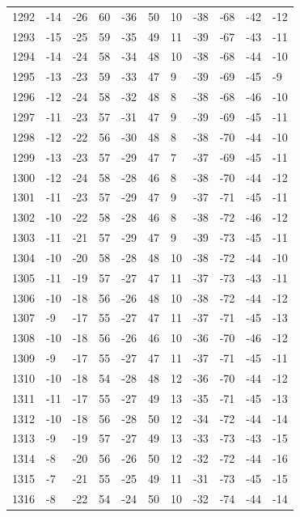 \begin{table}[H]
\begin{tabular}{lllllllllll}
1292 & -14 & -26 & 60 & -36 & 50 & 10 & -38 & -68 & -42 & -12 \\
1293 & -15 & -25 & 59 & -35 & 49 & 11 & -39 & -67 & -43 & -11 \\
1294 & -14 & -24 & 58 & -34 & 48 & 10 & -38 & -68 & -44 & -10 \\
1295 & -13 & -23 & 59 & -33 & 47 & 9 & -39 & -69 & -45 & -9 \\
1296 & -12 & -24 & 58 & -32 & 48 & 8 & -38 & -68 & -46 & -10 \\
1297 & -11 & -23 & 57 & -31 & 47 & 9 & -39 & -69 & -45 & -11 \\
1298 & -12 & -22 & 56 & -30 & 48 & 8 & -38 & -70 & -44 & -10 \\
1299 & -13 & -23 & 57 & -29 & 47 & 7 & -37 & -69 & -45 & -11 \\
1300 & -12 & -24 & 58 & -28 & 46 & 8 & -38 & -70 & -44 & -12 \\
1301 & -11 & -23 & 57 & -29 & 47 & 9 & -37 & -71 & -45 & -11 \\
1302 & -10 & -22 & 58 & -28 & 46 & 8 & -38 & -72 & -46 & -12 \\
1303 & -11 & -21 & 57 & -29 & 47 & 9 & -39 & -73 & -45 & -11 \\
1304 & -10 & -20 & 58 & -28 & 48 & 10 & -38 & -72 & -44 & -10 \\
1305 & -11 & -19 & 57 & -27 & 47 & 11 & -37 & -73 & -43 & -11 \\
1306 & -10 & -18 & 56 & -26 & 48 & 10 & -38 & -72 & -44 & -12 \\
1307 & -9 & -17 & 55 & -27 & 47 & 11 & -37 & -71 & -45 & -13 \\
1308 & -10 & -18 & 56 & -26 & 46 & 10 & -36 & -70 & -46 & -12 \\
1309 & -9 & -17 & 55 & -27 & 47 & 11 & -37 & -71 & -45 & -11 \\
1310 & -10 & -18 & 54 & -28 & 48 & 12 & -36 & -70 & -44 & -12 \\
1311 & -11 & -17 & 55 & -27 & 49 & 13 & -35 & -71 & -45 & -13 \\
1312 & -10 & -18 & 56 & -28 & 50 & 12 & -34 & -72 & -44 & -14 \\
1313 & -9 & -19 & 57 & -27 & 49 & 13 & -33 & -73 & -43 & -15 \\
1314 & -8 & -20 & 56 & -26 & 50 & 12 & -32 & -72 & -44 & -16 \\
1315 & -7 & -21 & 55 & -25 & 49 & 11 & -31 & -73 & -45 & -15 \\
1316 & -8 & -22 & 54 & -24 & 50 & 10 & -32 & -74 & -44 & -14 \\

\end{tabular}
\end{table}
